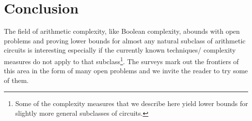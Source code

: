 \section{Conclusion}\label{sec:conclusion}
	The field of arithmetic complexity, like Boolean complexity, 
	abounds with open problems and proving lower bounds for 
	almost any natural subclass of arithmetic circuits is 
	interesting especially if the currently known techniques/
	complexity measures do not apply to that subclass\footnote{
		Some of the complexity measures that we describe here 
		yield lower bounds for slightly more general subclasses 
		of circuits.
	}. 
	The surveys \cite{aviSurvey, sy, ckw11} mark out the 
	frontiers of this area in the form of many open problems 
	and we invite the reader to try some of them.
	
	

